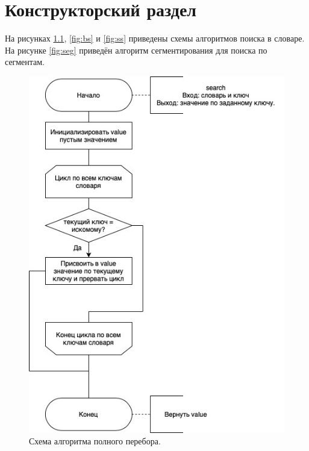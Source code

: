 \chapter{Конструкторский раздел}
На рисунках \ref{fig:s}, \ref{fig:bs} и \ref{fig:ss} приведены схемы алгоритмов поиска в словаре. На рисунке  \ref{fig:seg} приведён алгоритм сегментирования для поиска по сегментам.

\begin{figure}[H]
	\centering
	\includegraphics[scale=0.57]{inc/scheme-search.jpg}
	\caption{Схема алгоритма полного перебора.}
	\label{fig:s}
\end{figure}

